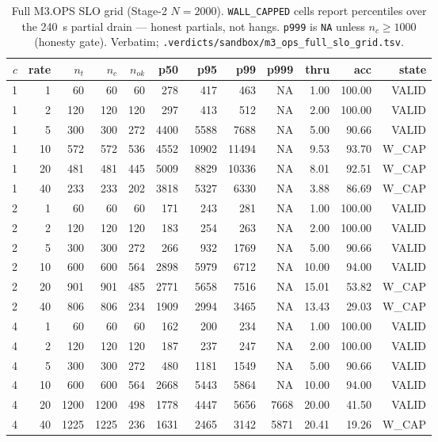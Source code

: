 \documentclass[11pt,a4paper]{article}
\begin{document}
\begin{table}[h]
\centering
\caption{Full M3.OPS SLO grid (Stage-2 \(N{=}2000\)). \texttt{WALL\_CAPPED}
  cells report percentiles over the \SI{240}{\second} partial drain --- honest
  partials, not hangs. \texttt{p999} is \texttt{NA} unless
  \(n_c\ge1000\) (honesty gate). Verbatim;
  \texttt{.verdicts/sandbox/m3\_ops\_full\_slo\_grid.tsv}.}
\label{tab:grid-app}
\small
\begin{tabular}{rrrrrrrrrrrr}
\toprule
\(c\) & rate & \(n_t\) & \(n_c\) & \(n_{ok}\) & p50 & p95 & p99 & p999 & thru & acc & state \\
\midrule
1 & 1  & 60   & 60   & 60  & 278  & 417   & 463   & NA   & 1.00  & 100.00 & VALID \\
1 & 2  & 120  & 120  & 120 & 297  & 413   & 512   & NA   & 2.00  & 100.00 & VALID \\
1 & 5  & 300  & 300  & 272 & 4400 & 5588  & 7688  & NA   & 5.00  & 90.66  & VALID \\
1 & 10 & 572  & 572  & 536 & 4552 & 10902 & 11494 & NA   & 9.53  & 93.70  & W\_CAP \\
1 & 20 & 481  & 481  & 445 & 5009 & 8829  & 10336 & NA   & 8.01  & 92.51  & W\_CAP \\
1 & 40 & 233  & 233  & 202 & 3818 & 5327  & 6330  & NA   & 3.88  & 86.69  & W\_CAP \\
\midrule
2 & 1  & 60   & 60   & 60  & 171  & 243   & 281   & NA   & 1.00  & 100.00 & VALID \\
2 & 2  & 120  & 120  & 120 & 183  & 254   & 263   & NA   & 2.00  & 100.00 & VALID \\
2 & 5  & 300  & 300  & 272 & 266  & 932   & 1769  & NA   & 5.00  & 90.66  & VALID \\
2 & 10 & 600  & 600  & 564 & 2898 & 5979  & 6712  & NA   & 10.00 & 94.00  & VALID \\
2 & 20 & 901  & 901  & 485 & 2771 & 5658  & 7516  & NA   & 15.01 & 53.82  & W\_CAP \\
2 & 40 & 806  & 806  & 234 & 1909 & 2994  & 3465  & NA   & 13.43 & 29.03  & W\_CAP \\
\midrule
4 & 1  & 60   & 60   & 60  & 162  & 200   & 234   & NA   & 1.00  & 100.00 & VALID \\
4 & 2  & 120  & 120  & 120 & 187  & 237   & 247   & NA   & 2.00  & 100.00 & VALID \\
4 & 5  & 300  & 300  & 272 & 480  & 1181  & 1549  & NA   & 5.00  & 90.66  & VALID \\
4 & 10 & 600  & 600  & 564 & 2668 & 5443  & 5864  & NA   & 10.00 & 94.00  & VALID \\
4 & 20 & 1200 & 1200 & 498 & 1778 & 4447  & 5656  & 7668 & 20.00 & 41.50  & VALID \\
4 & 40 & 1225 & 1225 & 236 & 1631 & 2465  & 3142  & 5871 & 20.41 & 19.26  & W\_CAP \\
\bottomrule
\end{tabular}
\end{table}
\end{document}
